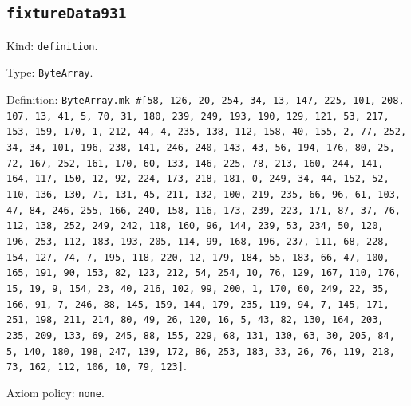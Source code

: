 \documentclass[11pt]{article}
\begin{document}
\subsection*{\texttt{fixtureData931}}
\noindent Kind: \texttt{definition}.\par
\noindent Type: \texttt{ByteArray}.\par
\noindent Definition: \texttt{ByteArray.mk \#[58, 126, 20, 254, 34, 13, 147, 225, 101, 208, 107, 13, 41, 5, 70, 31, 180, 239, 249, 193, 190, 129, 121, 53, 217, 153, 159, 170, 1, 212, 44, 4, 235, 138, 112, 158, 40, 155, 2, 77, 252, 34, 34, 101, 196, 238, 141, 246, 240, 143, 43, 56, 194, 176, 80, 25, 72, 167, 252, 161, 170, 60, 133, 146, 225, 78, 213, 160, 244, 141, 164, 117, 150, 12, 92, 224, 173, 218, 181, 0, 249, 34, 44, 152, 52, 110, 136, 130, 71, 131, 45, 211, 132, 100, 219, 235, 66, 96, 61, 103, 47, 84, 246, 255, 166, 240, 158, 116, 173, 239, 223, 171, 87, 37, 76, 112, 138, 252, 249, 242, 118, 160, 96, 144, 239, 53, 234, 50, 120, 196, 253, 112, 183, 193, 205, 114, 99, 168, 196, 237, 111, 68, 228, 154, 127, 74, 7, 195, 118, 220, 12, 179, 184, 55, 183, 66, 47, 100, 165, 191, 90, 153, 82, 123, 212, 54, 254, 10, 76, 129, 167, 110, 176, 15, 19, 9, 154, 23, 40, 216, 102, 99, 200, 1, 170, 60, 249, 22, 35, 166, 91, 7, 246, 88, 145, 159, 144, 179, 235, 119, 94, 7, 145, 171, 251, 198, 211, 214, 80, 49, 26, 120, 16, 5, 43, 82, 130, 164, 203, 235, 209, 133, 69, 245, 88, 155, 229, 68, 131, 130, 63, 30, 205, 84, 5, 140, 180, 198, 247, 139, 172, 86, 253, 183, 33, 26, 76, 119, 218, 73, 162, 112, 106, 10, 79, 123]}.\par
\noindent Axiom policy: \texttt{none}.\par
\end{document}
